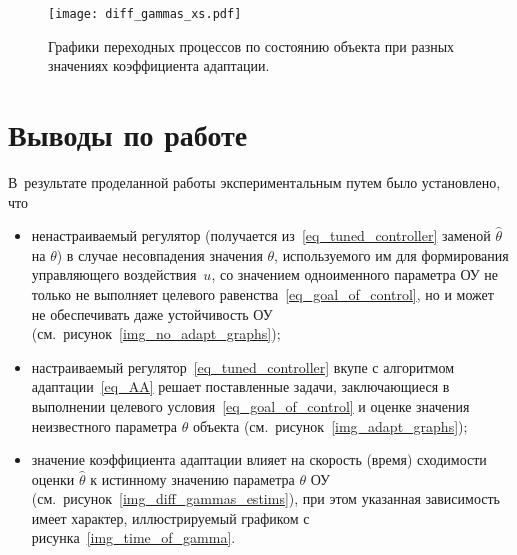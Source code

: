 \begin{figure}[h!]
    \centering
    \texttt{[image: diff\_gammas\_xs.pdf]}
    \caption{Графики переходных процессов по состоянию объекта при разных значениях коэффициента адаптации.}
    \label{img_last}
\end{figure}

\newpage
\mbox{}
\newpage


\section{Выводы по работе}
В~результате проделанной работы экспериментальным путем было установлено, что
\begin{itemize}
    \item ненастраиваемый регулятор (получается из~\eqref{eq_tuned_controller} заменой $\hat{\theta}$ на $\theta$) в случае несовпадения значения $\theta$, используемого им для формирования управляющего воздействия~$u$, со значением одноименного параметра ОУ не только не выполняет целевого равенства~\eqref{eq_goal_of_control}, но и может не обеспечивать даже устойчивость ОУ (см.~рисунок~\ref{img_no_adapt_graphs});
    \item настраиваемый регулятор~\eqref{eq_tuned_controller} вкупе с алгоритмом адаптации~\eqref{eq_AA} решает поставленные задачи, заключающиеся в выполнении целевого условия~\eqref{eq_goal_of_control} и оценке значения неизвестного параметра $\theta$ объекта (см.~рисунок~\ref{img_adapt_graphs});
    \item значение коэффициента адаптации влияет на скорость (время) сходимости оценки $\hat{\theta}$ к истинному значению параметра $\theta$ ОУ (см.~рисунок~\ref{img_diff_gammas_estims}), при этом указанная зависимость имеет характер, иллюстрируемый графиком с рисунка~\ref{img_time_of_gamma}.
\end{itemize}
